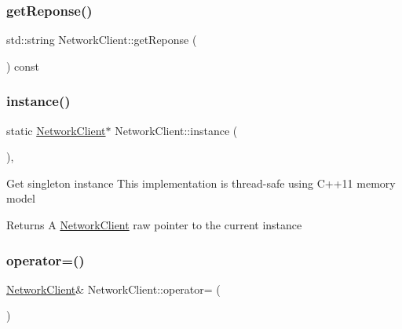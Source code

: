 \mbox{\label{classNetworkClient_af565bdc7544ed059d3bc2756d1c227d4}} 
\subsubsection{\texorpdfstring{get\+Reponse()}{getReponse()}}
{\footnotesize\ttfamily std\+::string Network\+Client\+::get\+Reponse (\begin{DoxyParamCaption}{ }\end{DoxyParamCaption}) const}

\mbox{\label{classNetworkClient_a1fbd2083ac90e4399ad733a0d10ce060}} 
\subsubsection{\texorpdfstring{instance()}{instance()}}
{\footnotesize\ttfamily static \hyperlink{classNetworkClient}{Network\+Client}$\ast$ Network\+Client\+::instance (\begin{DoxyParamCaption}{ }\end{DoxyParamCaption})\hspace{0.3cm}{\ttfamily [inline]}, {\ttfamily [static]}}

Get singleton instance This implementation is thread-\/safe using C++11 memory model \begin{DoxyReturn}{Returns}
A \hyperlink{classNetworkClient}{Network\+Client} raw pointer to the current instance 
\end{DoxyReturn}
\mbox{\label{classNetworkClient_a81d168b19e4fb79372b8129690946f73}} 
\subsubsection{\texorpdfstring{operator=()}{operator=()}}
{\footnotesize\ttfamily \hyperlink{classNetworkClient}{Network\+Client}\& Network\+Client\+::operator= (\begin{DoxyParamCaption}\item[{const \hyperlink{classNetworkClient}{Network\+Client} \&}]{ }\end{DoxyParamCaption})\hspace{0.3cm}{\ttfamily [delete]}}


